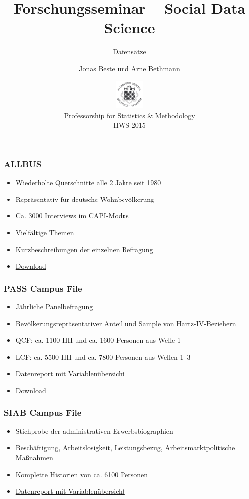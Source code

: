 \documentclass{beamer}
\title{Forschungsseminar -- Social Data Science}
\subtitle{Datensätze}
\author[Beste \& Bethmann]{Jonas Beste und Arne Bethmann}
\date{\includegraphics[height=1.5cm]{../../img/150px-Uni_Mannheim_Siegel.png} \\
  \href{http://sswml.uni-mannheim.de/}{Professorship for Statistics \& Methodology} \\
  HWS 2015}
\begin{document}
\begin{frame}
  \titlepage
\end{frame}


\begin{frame}
  \frametitle{ALLBUS}
  \begin{itemize}
  \item Wiederholte Querschnitte alle 2 Jahre seit 1980
  \item Repräsentativ für deutsche Wohnbevölkerung
  \item Ca. 3000 Interviews im CAPI-Modus
  \item \href{http://www.gesis.org/allbus/allbus-inhalte/schwerpunktthemen/}{Vielfältige Themen}
  \item \href{http://www.gesis.org/fileadmin/upload/dienstleistung/daten/umfragedaten/allbus/dokumente/STUDIEN.PDF}{Kurzbeschreibungen der einzelnen Befragung}
  \item \href{http://www.gesis.org/allbus/datenzugang/}{Download}
  \end{itemize}
\end{frame}


\begin{frame}
  \frametitle{PASS Campus File}
  \begin{itemize}
  \item Jährliche Panelbefragung
  \item Bevölkerungsrepräsentativer Anteil und Sample von Hartz-IV-Beziehern
  \item QCF: ca. 1100 HH und ca. 1600 Personen aus Welle 1 
  \item LCF: ca. 5500 HH und ca. 7800 Personen aus Wellen 1--3
  \item \href{http://doku.iab.de/fdz/reporte/2011/DR_06-11.pdf}{Datenreport mit Variablenübersicht}
  \item \href{http://fdz.iab.de/de/campus-files/siab_cf/registration.aspx}{Download}
  \end{itemize}
\end{frame}


\begin{frame}
  \frametitle{SIAB Campus File}
  \begin{itemize}
  \item Stichprobe der administrativen Erwerbsbiographien
  \item Beschäftigung, Arbeitslosigkeit, Leistungsbezug, Arbeitsmarktpolitische Maßnahmen
  \item Komplette Historien von ca. 6100 Personen
  \item \href{http://doku.iab.de/fdz/reporte/2013/DR_05-13.pdf}{Datenreport mit Variablenübersicht}
  \end{itemize}
\end{frame}


\end{document}
